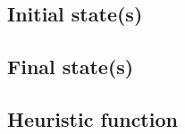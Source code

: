 \subsection{Initial state(s)}

\paragraph{}

\subsection{Final state(s)}

\paragraph{}

\subsection{Heuristic function}

\paragraph{}
